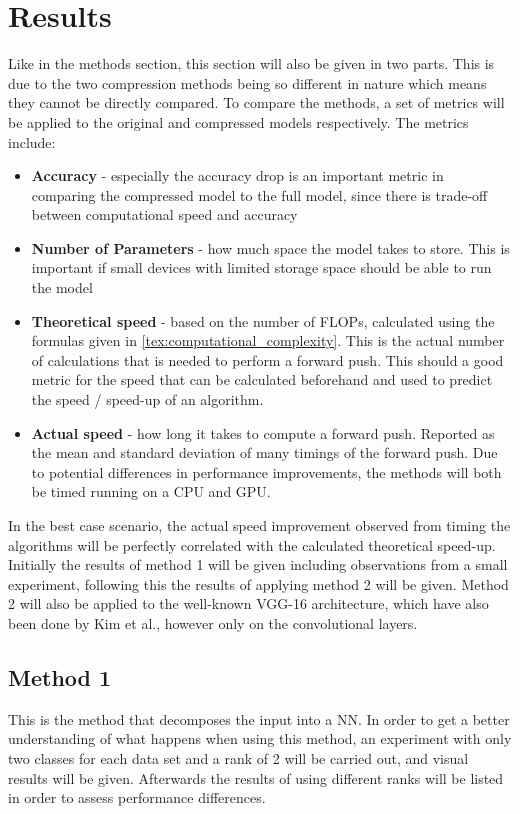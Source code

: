 \section{Results}
Like in the methods section, this section will also be given in two parts. This is due to the two compression methods being so different in nature which means they cannot be directly compared. To compare the methods, a set of metrics will be applied to the original and compressed models respectively. The metrics include:
\begin{itemize}
    \item \textbf{Accuracy} - especially the accuracy drop is an important metric in comparing the compressed model to the full model, since there is trade-off between computational speed and accuracy
    \item \textbf{Number of Parameters} - how much space the model takes to store. This is important if small devices with limited storage space should be able to run the model
    \item \textbf{Theoretical speed} - based on the number of FLOPs, calculated using the formulas given in \autoref{tex:computational_complexity}. This is the actual number of calculations that is needed to perform a forward push. This should a good metric for the speed that can be calculated beforehand and used to predict the speed / speed-up of an algorithm.
    \item \textbf{Actual speed} - how long it takes to compute a forward push. Reported as the mean and standard deviation of many timings of the forward push. Due to potential differences in performance improvements, the methods will both be timed running on a CPU and GPU.
\end{itemize}
In the best case scenario, the actual speed improvement observed from timing the algorithms will be perfectly correlated with the calculated theoretical speed-up. Initially the results of method 1 will be given including observations from a small experiment, following this the results of applying method 2 will be given. Method 2 will also be applied to the well-known VGG-16 architecture\cite{Simonyan2015}, which have also been done by Kim et al.\cite{Kim2016}, however only on the convolutional layers.

\subsection{Method 1}
This is the method that decomposes the input into a NN. In order to get a better understanding of what happens when using this method, an experiment with only two classes for each data set and a rank of 2 will be carried out, and visual results will be given. Afterwards the results of using different ranks will be listed in order to assess performance differences.

